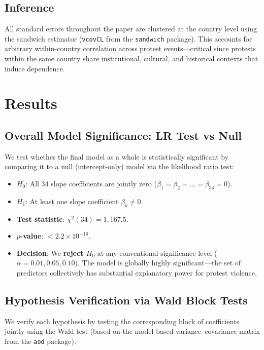 \documentclass[12pt,a4paper]{article}
\begin{document}
\subsection{Inference}

All standard errors throughout the paper are clustered at the country level using the sandwich estimator (\texttt{vcovCL} from the \texttt{sandwich} package). This accounts for arbitrary within-country correlation across protest events---critical since protests within the same country share institutional, cultural, and historical contexts that induce dependence.

\section{Results}

\subsection{Overall Model Significance: LR Test vs Null}

We test whether the final model as a whole is statistically significant by comparing it to a null (intercept-only) model via the likelihood ratio test:
\begin{itemize}
  \item $H_0$: All 34 slope coefficients are jointly zero ($\beta_1 = \beta_2 = \ldots = \beta_{34} = 0$).
  \item $H_1$: At least one slope coefficient $\beta_k \neq 0$.
  \item \textbf{Test statistic}: $\chi^2(34) = 1{,}167.5$.
  \item \textbf{$p$-value}: $< 2.2 \times 10^{-16}$.
  \item \textbf{Decision}: We \textbf{reject $H_0$} at any conventional significance level ($\alpha = 0.01, 0.05, 0.10$). The model is globally highly significant---the set of predictors collectively has substantial explanatory power for protest violence.
\end{itemize}

\subsection{Hypothesis Verification via Wald Block Tests}

We verify each hypothesis by testing the corresponding block of coefficients jointly using the Wald test (based on the model-based variance--covariance matrix from the \texttt{aod} package):
\end{document}
